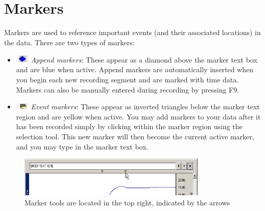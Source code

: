\documentclass{article}
\begin{document}
\section*{Markers}
Markers are used to reference important events (and their associated locations) in the data. There are two types of markers:
\begin{itemize}
	\item \includegraphics[width=0.05\textwidth]{../images/BIOPAC_append_marker.jpg} \textit{Append markers}: These appear as a diamond above the marker text box and are blue when active. Append markers are automatically inserted when you begin each new recording segment and are marked with time data. Markers can also be manually entered during recording by pressing F9.
	
	\item \includegraphics[width=0.05\textwidth]{../images/BIOPAC_event_marker.jpg} \textit{Event markers}: These appear as inverted triangles below the marker text region and are yellow when active. You may add markers to your data after it has been recorded simply by clicking within the marker region using the selection tool. This new marker will then become the current active marker, and you may type in the marker text box.
\end{itemize}

\begin{figure}[h]
		\includegraphics[width=0.8\textwidth]{../images/BIOPAC_12.jpg}
		\centering
		\caption{Marker tools are located in the top right, indicated by the arrows}
		\label{marker_tools}
		\end{figure}
\end{document}
